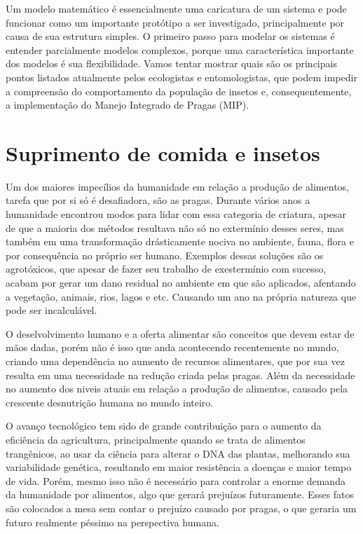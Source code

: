 Um modelo matemático é essencialmente uma caricatura de um sistema e pode funcionar como um importante protótipo a ser investigado, principalmente por causa de sua estrutura simples. O primeiro passo para modelar os sistemas é entender parcialmente modelos complexos, porque uma característica importante dos modelos é sua flexibilidade. Vamos tentar mostrar quais são os principais pontos listados atualmente pelos ecologistas e entomologistas, que podem impedir a compreensão do comportamento da população de insetos e, consequentemente, a implementação do Manejo Integrado de Pragas (MIP).

\section{Suprimento de comida e insetos}

Um dos maiores impecílios da humanidade em relação a produção de alimentos, tarefa que por si só é desafiadora, são as pragas. Durante vários anos a humanidade encontrou modos para lidar com essa categoria de criatura, apesar de que a maioria dos métodos resultava não só no extermínio desses seres, mas também em uma transformação drásticamente nociva no ambiente, fauna, flora e por consequência no próprio ser humano. Exemplos dessas soluções são os agrotóxicos, que apesar de fazer seu trabalho de exestermínio com sucesso, acabam por gerar um dano residual no ambiente em que são aplicados, afentando a vegetação, animais, rios, lagos e etc. Causando um ano na própria natureza que pode ser incalculável.

O deselvolvimento humano e a oferta alimentar são conceitos que devem estar de mãos dadas, porém não é isso que anda acontecendo recentemente no mundo, criando uma dependência no aumento de recursos alimentares, que por sua vez resulta em uma necessidade na redução criada pelas pragas. Além da necessidade no aumento dos niveis atuais em relação a produção de alimentos, causado pela crescente desnutrição humana no mundo inteiro.

O avanço tecnológico tem sido de grande contribuição para o aumento da eficiência da agricultura, principalmente quando se trata de alimentos trangênicos, ao usar da ciência para alterar o DNA das plantas, melhorando sua variabilidade genética, resultando em maior resistência a doenças e maior tempo de vida. Porém, mesmo isso não é necessário para controlar a enorme demanda da humanidade por alimentos, algo que gerará prejuízos futuramente. Esses fatos são colocados a mesa sem contar o prejuízo causado por pragas, o que geraria um futuro realmente péssimo na perspectiva humana.


